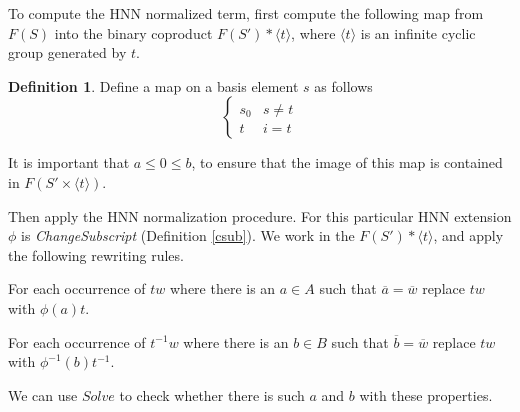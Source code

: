 \documentclass[12pt]{article} %
\theoremstyle{definition}
\theoremstyle{definition}
\theoremstyle{definition}
\theoremstyle{definition}
\theoremstyle{definition}
\newtheorem{defn}[theorem]{Definition}
\theoremstyle{definition}
\begin{document}
To compute the HNN normalized term,
first compute the following map from $F(S)$ into the binary
coproduct $F(S') \ast \langle t \rangle$, where $\langle t \rangle$ is an infinite
cyclic group generated by $t$.

\begin{defn}\label{tocoprod}
  Define a map on a basis element $s$ as follows
  \begin{equation}
    \begin{cases}
      s_0 & s \ne t \\
      t & i = t
    \end{cases}
  \end{equation}
\end{defn}

It is important that $a \le 0 \le b$, to ensure that the image
of this map is contained in $F(S' \times \langle t \rangle)$.

Then apply the HNN normalization procedure. For this particular HNN extension
$\phi$ is \textit{ChangeSubscript} (Definition \ref{csub}).
We work in the $F(S') \ast \langle t \rangle$, and apply the following rewriting rules.

For each occurrence of $tw$ where there is an $a \in A$ such that
$\overline{a} = \overline{w}$ replace $tw$ with $\phi(a)t$.

For each occurrence of $t^{-1}w$ where there is an $b \in B$ such that
$\overline{b} = \overline{w}$ replace $tw$ with $\phi^{-1}(b)t^{-1}$.

We can use $\textit{Solve}$ to check whether there is such $a$ and $b$ with
these properties.




\end{document}
